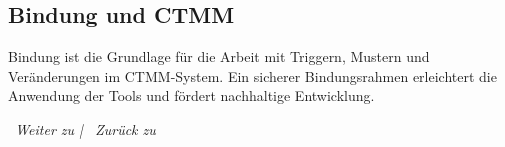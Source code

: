\subsection*{\textcolor{ctmmBlue}{Bindung und CTMM}}
Bindung ist die Grundlage für die Arbeit mit Triggern, Mustern und Veränderungen im CTMM-System. Ein sicherer Bindungsrahmen erleichtert die Anwendung der Tools und fördert nachhaltige Entwicklung.

\vspace{1cm}
\begin{center}
\textit{\textcolor{ctmmGreen}{\faChevronRight~Weiter zu}  | \textcolor{ctmmBlue}{\faChevronLeft~Zurück zu} }
\end{center}
